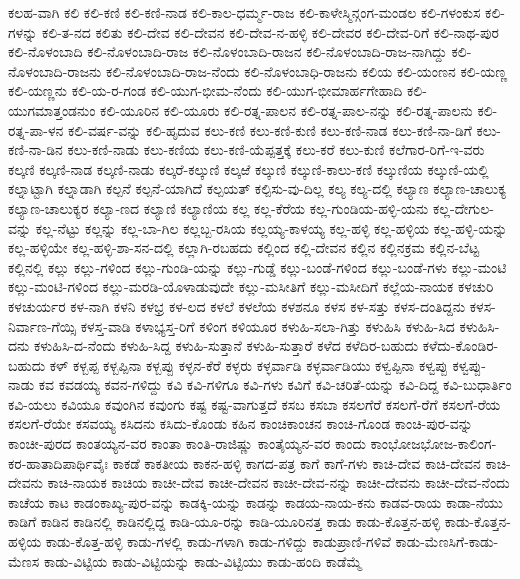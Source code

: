 {ಕಲಹ-ವಾಗಿ
ಕಲಿ
ಕಲಿ-ಕಣಿ
ಕಲಿ-ಕಣಿ-ನಾಡ
ಕಲಿ-ಕಾಲ-ಧರ್ಮ್ಮ-ರಾಜ
ಕಲಿ-ಕಾಳೇಸ್ಮಿನ್ಗಂಗ-ಮಂಡಲ
ಕಲಿ-ಗಳಂಕುಸ
ಕಲಿ-ಗಳನ್ನು
ಕಲಿ-ತ-ನದ
ಕಲಿತು
ಕಲಿ-ದೇವ
ಕಲಿ-ದೇವನ
ಕಲಿ-ದೇವ-ನ-ಹಳ್ಳಿ
ಕಲಿ-ದೇವರ
ಕಲಿ-ದೇವ-ರಿಗೆ
ಕಲಿ-ನಾಥ-ಪುರ
ಕಲಿ-ನೊಳಂಬಾದಿ
ಕಲಿ-ನೊಳಂಬಾದಿ-ರಾಜ
ಕಲಿ-ನೊಳಂಬಾದಿ-ರಾಜನ
ಕಲಿ-ನೊಳಂಬಾದಿ-ರಾಜ-ನಾಗಿದ್ದು
ಕಲಿ-ನೊಳಂಬಾದಿ-ರಾಜನು
ಕಲಿ-ನೊಳಂಬಾದಿ-ರಾಜ-ನೆಂದು
ಕಲಿ-ನೊಳಂಬಾಧಿ-ರಾಜನು
ಕಲಿಯ
ಕಲಿ-ಯಂಣನ
ಕಲಿ-ಯಣ್ಣ
ಕಲಿ-ಯಣ್ಣನು
ಕಲಿ-ಯ-ರ-ಗಂಡ
ಕಲಿ-ಯುಗ-ಭೀಮ-ನೆಂದು
ಕಲಿ-ಯುಗ-ಭೀಮಾರ್ಹಗೇಹಾದಿ
ಕಲಿ-ಯುಗಮಾತ್ತಂಡನುಂ
ಕಲಿ-ಯೂರಿನ
ಕಲಿ-ಯೂರು
ಕಲಿ-ರತ್ನ-ಪಾಲನ
ಕಲಿ-ರತ್ನ-ಪಾಲ-ನನ್ನು
ಕಲಿ-ರತ್ನ-ಪಾಲನು
ಕಲಿ-ರತ್ನ-ಪಾ-ಳನ
ಕಲಿ-ವರ್ಷ-ವನ್ನು
ಕಲಿ-ಹೃದುವ
ಕಲು-ಕಣಿ
ಕಲು-ಕಣಿ-ಕುಣಿ
ಕಲು-ಕಣಿ-ನಾಡ
ಕಲು-ಕಣಿ-ನಾ-ಡಿಗೆ
ಕಲು-ಕಣಿ-ನಾ-ಡಿನ
ಕಲು-ಕಣಿ-ನಾಡು
ಕಲು-ಕಣಿಯ
ಕಲು-ಕಣಿ-ಯೆಪ್ಪತ್ತಕ್ಕೆ
ಕಲು-ಕರೆ
ಕಲು-ಕುಣಿ
ಕಲೆಗಾರ-ರಿಗೆ-ಇ-ವರು
ಕಲ್ಕಣಿ
ಕಲ್ಕಣಿ-ನಾಡ
ಕಲ್ಕಣಿ-ನಾಡು
ಕಲ್ಕರೆ-ಕಲ್ಕುಣಿ
ಕಲ್ಕಱೆ
ಕಲ್ಕುಣಿ
ಕಲ್ಕುಣಿ-ಕಾಲು-ಕಣಿ
ಕಲ್ಕುಣಿಯ
ಕಲ್ಕುಣಿ-ಯಲ್ಲಿ
ಕಲ್ನಾಟ್ಟಾಗಿ
ಕಲ್ನಾಡಾಗಿ
ಕಲ್ಪನೆ
ಕಲ್ಪನೆ-ಯಾಗಿದೆ
ಕಲ್ಪಯತ್
ಕಲ್ಪಿಸು-ವು-ದಿಲ್ಲ
ಕಲ್ಯ
ಕಲ್ಯ-ದಲ್ಲಿ
ಕಲ್ಯಾಣ
ಕಲ್ಯಾಣ-ಚಾಲುಕ್ಯ
ಕಲ್ಯಾಣ-ಚಾಲುಕ್ಯರ
ಕಲ್ಯಾ-ಣದ
ಕಲ್ಯಾಣಿ
ಕಲ್ಯಾಣಿಯ
ಕಲ್ಲ
ಕಲ್ಲ-ಕೆರೆಯ
ಕಲ್ಲ-ಗುಂಡಿಯ-ಹಳ್ಳಿ-ಯನು
ಕಲ್ಲ-ದೇಗುಲ-ವನ್ನು
ಕಲ್ಲ-ನೆಟ್ಟು
ಕಲ್ಲನ್ನು
ಕಲ್ಲ-ಬಾ-ಗಿಲ
ಕಲ್ಲಬ್ಬ-ರಸಿಯ
ಕಲ್ಲಯ್ಯ-ಕಾಳಯ್ಯ
ಕಲ್ಲ-ಹಳ್ಳಿ
ಕಲ್ಲ-ಹಳ್ಳಿಯ
ಕಲ್ಲ-ಹಳ್ಳಿ-ಯನ್ನು
ಕಲ್ಲ-ಹಳ್ಳಿಯೇ
ಕಲ್ಲ-ಹಳ್ಳಿ-ಶಾ-ಸನ-ದಲ್ಲಿ
ಕಲ್ಲಾಗಿ-ರಬಹದು
ಕಲ್ಲಿಂದ
ಕಲ್ಲಿ-ದೇವನ
ಕಲ್ಲಿನ
ಕಲ್ಲಿನಕ್ರಮ
ಕಲ್ಲಿನ-ಬೆಟ್ಟ
ಕಲ್ಲಿನಲ್ಲಿ
ಕಲ್ಲು
ಕಲ್ಲು-ಗಳಿಂದ
ಕಲ್ಲು-ಗುಂಡಿ-ಯನ್ನು
ಕಲ್ಲು-ಗುಡ್ಡೆ
ಕಲ್ಲು-ಬಂಡೆ-ಗಳಿಂದ
ಕಲ್ಲು-ಬಂಡೆ-ಗಳು
ಕಲ್ಲು-ಮಂಟಿ
ಕಲ್ಲು-ಮಂಟಿ-ಗಳಿಂದ
ಕಲ್ಲು-ಮರಡಿ-ಯೊಳಾಡುವುದೇ
ಕಲ್ಲು-ಮಸೀತಿಗೆ
ಕಲ್ಲು-ಮಸೀದಿಗೆ
ಕಲ್ಲೆಯ-ನಾಯಕ
ಕಳಚುರಿ
ಕಳಚುರ್ಯರ
ಕಳ-ನಾಗಿ
ಕಳನಿ
ಕಳಭ್ರ
ಕಳ-ಲದ
ಕಳಲೆ
ಕಳಲೆಯ
ಕಳಶನೂ
ಕಳಸ
ಕಳ-ಸತ್ತು
ಕಳಸ-ದಂತಿದ್ದನು
ಕಳಸ-ನಿರ್ವಾಣ-ಗೆಯ್ಸಿ
ಕಳಸ್ತ-ವಾಡಿ
ಕಳಾಭ್ಯಸ್ತ-ರಿಗೆ
ಕಳಿಂಗ
ಕಳಿಯೂರ
ಕಳುಹಿ-ಸಲಾ-ಗಿತ್ತು
ಕಳುಹಿಸಿ
ಕಳುಹಿ-ಸಿದ
ಕಳುಹಿಸಿ-ದನು
ಕಳುಹಿಸಿ-ದ-ನೆಂದು
ಕಳುಹಿ-ಸಿದ್ದ
ಕಳುಹಿ-ಸುತ್ತಾನೆ
ಕಳುಹಿ-ಸುತ್ತಾರೆ
ಕಳೆದ
ಕಳೆದಿರ-ಬಹುದು
ಕಳೆದು-ಕೊಂಡಿರ-ಬಹುದು
ಕಳ್
ಕಳ್ಬಪ್ಪ
ಕಳ್ಬಪ್ಪಿನಾ
ಕಳ್ಬಪ್ಪು
ಕಳ್ಳನ-ಕೆರೆ
ಕಳ್ಳರು
ಕಳ್ಳರ್ವಾಡಿ
ಕಳ್ಳರ್ವಾಡಿಯು
ಕಳ್ವಪ್ಪಿನಾ
ಕಳ್ವಪ್ಪು
ಕಳ್ವಪ್ಪು-ನಾಡು
ಕವ
ಕವಡಯ್ಯ
ಕವನ-ಗಳಿದ್ದು
ಕವಿ
ಕವಿ-ಗಳಿಗೂ
ಕವಿ-ಗಳು
ಕವಿಗೆ
ಕವಿ-ಚರಿತೆ-ಯನ್ನು
ಕವಿ-ದಿದ್ದ
ಕವಿ-ಬುಧಾರ್ತಿಂ
ಕವಿ-ಯಲು
ಕವಿಯೂ
ಕವುಂಗಿನ
ಕವುಂಗು
ಕಷ್ಟ
ಕಷ್ಟ-ವಾಗುತ್ತದೆ
ಕಸಬ
ಕಸಬಾ
ಕಸಲಗೆರೆ
ಕಸಲಗೆ-ರೆಗೆ
ಕಸಲಗೆ-ರೆಯ
ಕಸಲಗೆ-ರೆಯೇ
ಕಸವಯ್ಯ
ಕಸಿದನು
ಕಸಿದು-ಕೊಂಡು
ಕಹಿನ
ಕಾಂಚಿಕಾಂಚನ
ಕಾಂಚಿ-ಗೊಂಡ
ಕಾಂಚಿ-ಪುರ-ವನ್ನು
ಕಾಂಚೀ-ಪುರದ
ಕಾಂತಯ್ಯನ-ವರ
ಕಾಂತಾ
ಕಾಂತಿ-ರಾಜಿಷ್ಣು
ಕಾಂತೈಯ್ಯನ-ವರ
ಕಾಂದು
ಕಾಂಭೋಜಭೋಜ-ಕಾಲಿಂಗ-ಕರ-ಹಾತಾದಿಪಾರ್ಥಿವೈಃ
ಕಾಕಡೆ
ಕಾಕತೀಯ
ಕಾಕನ-ಹಳ್ಳಿ
ಕಾಗದ-ಪತ್ರ
ಕಾಗೆ
ಕಾಗೆ-ಗಳು
ಕಾಚಿ-ದೇವ
ಕಾಚಿ-ದೇವನ
ಕಾಚಿ-ದೇವನು
ಕಾಚಿ-ನಾಯಕ
ಕಾಚಿಯ
ಕಾಚೀ-ದೇವ
ಕಾಚೀ-ದೇವನ
ಕಾಚೀ-ದೇವ-ನನ್ನು
ಕಾಚೀ-ದೇವನು
ಕಾಚೀ-ದೇವ-ನೆಂದು
ಕಾಚೆಯ
ಕಾಟ
ಕಾಡಂಕಾಖ್ಯ-ಪುರ-ವನ್ನು
ಕಾಡಕ್ಕಿ-ಯನ್ನು
ಕಾಡನ್ನು
ಕಾಡಯ-ನಾಯ-ಕನು
ಕಾಡವ-ರಾಯ
ಕಾಡಾ-ನೆಯು
ಕಾಡಿಗೆ
ಕಾಡಿನ
ಕಾಡಿನಲ್ಲಿ
ಕಾಡಿನಲ್ಲಿದ್ದ
ಕಾಡಿ-ಯೂ-ರನ್ನು
ಕಾಡಿ-ಯೂರಿನತ್ತ
ಕಾಡು
ಕಾಡು-ಕೊತ್ತನ-ಹಳ್ಳಿ
ಕಾಡು-ಕೊತ್ತನ-ಹಳ್ಳಿಯ
ಕಾಡು-ಕೊತ್ತ-ಹಳ್ಳಿ
ಕಾಡು-ಗಳಲ್ಲಿ
ಕಾಡು-ಗಳಾಗಿ
ಕಾಡು-ಗಳಿದ್ದು
ಕಾಡುಪ್ರಾಣಿ-ಗಳಿವೆ
ಕಾಡು-ಮೆಣಸಿಗೆ-ಕಾಡು-ಮೆಣಸ
ಕಾಡು-ವಿಟ್ಟಿಯ
ಕಾಡು-ವಿಟ್ಟಿಯನ್ನು
ಕಾಡು-ವಿಟ್ಟಿಯು
ಕಾಡು-ಹಂದಿ
ಕಾಡೆಮ್ಮೆ
}
